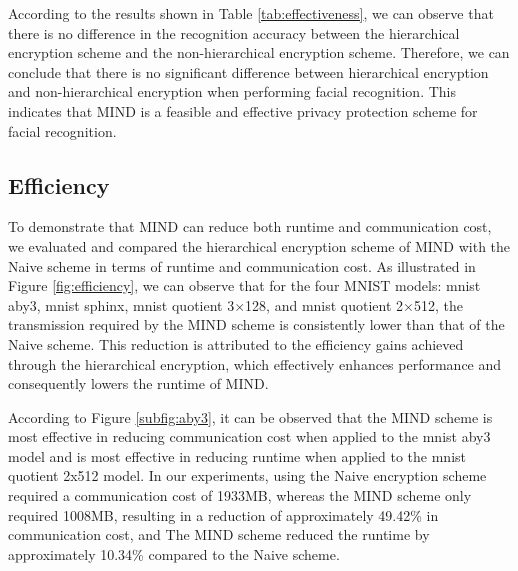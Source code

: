 \documentclass[conference]{IEEEtran}
\begin{document}
According to the results shown in Table \ref{tab:effectiveness}, we can observe that there is no difference in the recognition accuracy between the hierarchical encryption scheme and the non-hierarchical encryption scheme. Therefore, we can conclude that there is no significant difference between hierarchical encryption and non-hierarchical encryption when performing facial recognition. This indicates that MIND is a feasible and effective privacy protection scheme for facial recognition.

\subsection{Efficiency}
To demonstrate that MIND can reduce both runtime and communication cost, we evaluated and compared the hierarchical encryption scheme of MIND with the Naive scheme in terms of runtime and communication cost. As illustrated in Figure \ref{fig:efficiency}, we can observe that for the four MNIST models: mnist aby3, mnist sphinx, mnist quotient 3$\times$128, and mnist quotient 2$\times$512, the transmission required by the MIND scheme is consistently lower than that of the Naive scheme. This reduction is attributed to the efficiency gains achieved through the hierarchical encryption, which effectively enhances performance and consequently lowers the runtime of MIND.

According to Figure \ref{subfig:aby3}, it can be observed that the MIND scheme is most effective in reducing communication cost when applied to the mnist aby3 model and is most effective in reducing runtime when applied to the mnist quotient 2x512 model. In our experiments, using the Naive encryption scheme required a communication cost of 1933MB, whereas the MIND scheme only required 1008MB, resulting in a reduction of approximately 49.42\% in communication cost, and The MIND scheme reduced the runtime by approximately 10.34\% compared to the Naive scheme. 
\end{document}
